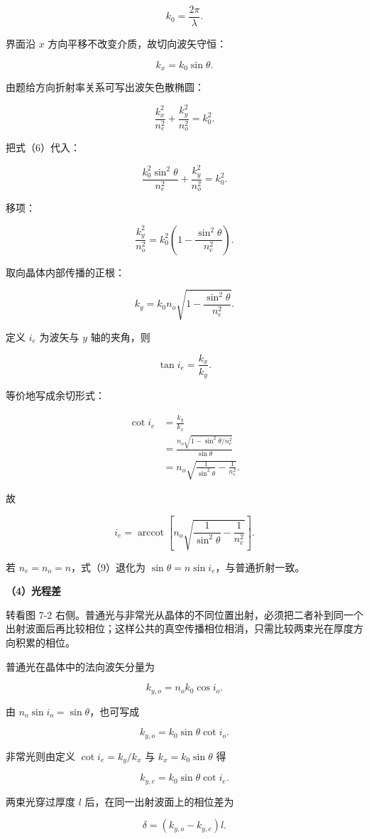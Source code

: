 \documentclass[12pt,a4paper,UTF8]{ctexart}
\begin{document}
\[k_0=\frac{2\pi}{\lambda}.\]

界面沿 \(x\) 方向平移不改变介质，故切向波矢守恒：

\[k_x=k_0\sin\theta.\]

由题给方向折射率关系可写出波矢色散椭圆：

\[\frac{k_x^2}{n_e^2}+\frac{k_y^2}{n_o^2}=k_0^2.\]

把式（6）代入：

\[\frac{k_0^2\sin^2\theta}{n_e^2}
+\frac{k_y^2}{n_o^2}=k_0^2.\]

移项：

\[\frac{k_y^2}{n_o^2}
=k_0^2\left(1-\frac{\sin^2\theta}{n_e^2}\right).\]

取向晶体内部传播的正根：

\[k_y=k_0n_o\sqrt{1-\frac{\sin^2\theta}{n_e^2}}.\]

定义 \(i_e\) 为波矢与 \(y\) 轴的夹角，则

\[\tan i_e=\frac{k_x}{k_y}.\]

等价地写成余切形式：

\[\begin{aligned}
\cot i_e
&=\frac{k_y}{k_x}\\
&=\frac{n_o\sqrt{1-\sin^2\theta/n_e^2}}{\sin\theta}\\
&=n_o\sqrt{\frac1{\sin^2\theta}-\frac1{n_e^2}}.
\end{aligned}\]

故

\[\boxed{
i_e=\operatorname{arccot}\left[
n_o\sqrt{\frac1{\sin^2\theta}-\frac1{n_e^2}}
\right]}.\]

若 \(n_e=n_o=n\)，式（9）退化为
\(\sin\theta=n\sin i_e\)，与普通折射一致。

\textbf{（4）光程差}

转看图 7-2
右侧。普通光与非常光从晶体的不同位置出射，必须把二者补到同一个出射波面后再比较相位；这样公共的真空传播相位相消，只需比较两束光在厚度方向积累的相位。

普通光在晶体中的法向波矢分量为

\[k_{y,o}=n_ok_0\cos i_o.\]

由 \(n_o\sin i_o=\sin\theta\)，也可写成

\[k_{y,o}=k_0\sin\theta\cot i_o.\]

非常光则由定义 \(\cot i_e=k_y/k_x\) 与 \(k_x=k_0\sin\theta\) 得

\[k_{y,e}=k_0\sin\theta\cot i_e.\]

两束光穿过厚度 \(l\) 后，在同一出射波面上的相位差为

\[\delta=(k_{y,o}-k_{y,e})l.\]
\end{document}

